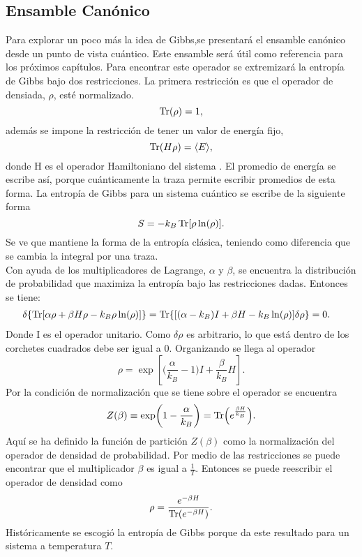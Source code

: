 \subsection{Ensamble Canónico}
Para explorar un poco más la idea de Gibbs,se presentará el ensamble canónico desde un punto de vista cuántico. Este ensamble será útil como referencia para los próximos capítulos. Para encontrar este operador se extremizará la entropía de Gibbs bajo dos restricciones. La primera restricción es que el operador de densiada, $\rho$, esté normalizado.
\begin{equation}
\Tr(\rho)=1,
\end{equation}
además se impone la restricción de tener un valor de energía fijo,
\begin{equation}
\Tr(H \rho)= \langle E \rangle,
\end{equation}
donde H  es el operador Hamiltoniano del sistema  \cite{ReichlStat}. El promedio de energía se escribe así, porque cuánticamente la traza permite escribir promedios de esta forma. La entropía de Gibbs para un sistema cuántico se escribe de la siguiente forma
\begin{equation}
S=-k_{B} \Tr[\rho \ln (\rho)].
\end{equation}
Se ve que mantiene la forma de la entropía clásica, teniendo como diferencia que se cambia la integral por una traza. \\
Con ayuda de los multiplicadores de Lagrange, $\alpha$ y $\beta$, se encuentra la distribución de probabilidad que maximiza la entropía bajo las restricciones dadas. Entonces se tiene:
\begin{align}
\delta \{ \Tr [ \alpha \rho + \beta H \rho - k_{B} \rho \ln (\rho)] \} 
&= \Tr \{ [(\alpha - k_{B})I + \beta H - k_{B} \ln (\rho) ] \delta \rho \}=0.
\end{align}
Donde I es el operador unitario. Como $\delta \rho$ es arbitrario, lo que está dentro de los corchetes cuadrados debe ser igual a 0. Organizando se llega al operador
\begin{equation}
\rho= \exp [ \bigg( \frac{ \alpha }{k_{B}}-1 \bigg) I + \frac{\beta}{k_{B}}H ].
\end{equation}
Por la condición de normalización que se tiene sobre el operador se encuentra
\begin{equation}
Z(\beta) \equiv \exp (1- \frac{ \alpha }{k_{B}}) = \Tr (e^{\frac{\beta H}{k_{B}}}).
\end{equation}
Aquí se ha definido la función de partición $Z(\beta)$ como la normalización del operador de densidad de probabilidad. Por medio de las restricciones se puede encontrar que el multiplicador $\beta$ es igual a $\frac{1}{T}$. Entonces se puede reescribir el operador de densidad  como
\begin{equation}
\rho = \frac{ e^{-\beta H}}{\Tr( e^{-\beta H})}.
\end{equation}
Históricamente se escogió la entropía de Gibbs porque da este resultado para un sistema a temperatura $T$.
\\
